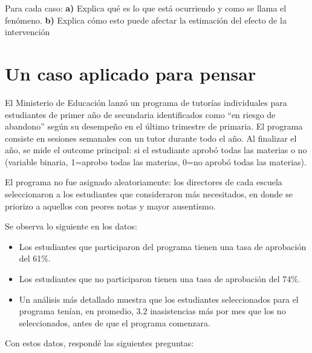 \documentclass[
  letterpaper,
  DIV=11,
  numbers=noendperiod,
  oneside]{scrreprt}
\begin{document}
Para cada caso: \textbf{a)} Explica qué es lo que está ocurriendo y como
se llama el fenómeno. \textbf{b)} Explica cómo esto puede afectar la
estimación del efecto de la intervención

\hypertarget{un-caso-aplicado-para-pensar-1}{%
\section{Un caso aplicado para
pensar}\label{un-caso-aplicado-para-pensar-1}}

El Ministerio de Educación lanzó un programa de tutorías individuales
para estudiantes de primer año de secundaria identificados como ``en
riesgo de abandono'' según su desempeño en el último trimestre de
primaria. El programa consiste en sesiones semanales con un tutor
durante todo el año. Al finalizar el año, se mide el outcome principal:
si el estudiante aprobó todas las materias o no (variable binaria,
1=aprobo todas las materias, 0=no aprobó todas las materias).

El programa no fue asignado aleatoriamente: los directores de cada
escuela seleccionaron a los estudiantes que consideraron más
necesitados, en donde se priorizo a aquellos con peores notas y mayor
ausentismo.

Se observa lo siguiente en los datos:

\begin{itemize}
\item
  Los estudiantes que participaron del programa tienen una tasa de
  aprobación del 61\%.
\item
  Los estudiantes que no participaron tienen una tasa de aprobación del
  74\%.
\item
  Un análisis más detallado muestra que los estudiantes seleccionados
  para el programa tenían, en promedio, \(3.2\) inasistencias más por
  mes que los no seleccionados, antes de que el programa comenzara.
\end{itemize}

Con estos datos, respondé las siguientes preguntas:
\end{document}
